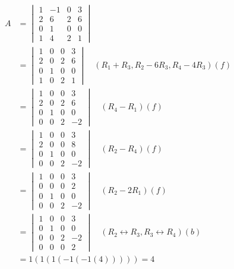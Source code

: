 \documentclass{math}
\begin{document}
\begin{align*}
  A &= \begin{vmatrix}
    1 & -1 & 0 & 3 \\
    2 & 6 & 2 & 6 \\
    0 & 1 & 0 & 0 \\
    1 & 4 & 2 & 1
  \end{vmatrix} \\
  &= \begin{vmatrix}
    1 & 0 & 0 & 3 \\
    2 & 0 & 2 & 6 \\
    0 & 1 & 0 & 0 \\
    1 & 0 & 2 & 1
  \end{vmatrix} \quad (R_1+R_3,R_2-6R_3,R_4-4R_3)(f) \\
  &= \begin{vmatrix}
    1 & 0 & 0 & 3 \\
    2 & 0 & 2 & 6 \\
    0 & 1 & 0 & 0 \\
    0 & 0 & 2 & -2
  \end{vmatrix} \quad (R_4-R_1)(f) \\
  &= \begin{vmatrix}
    1 & 0 & 0 & 3 \\
    2 & 0 & 0 & 8 \\
    0 & 1 & 0 & 0 \\
    0 & 0 & 2 & -2
  \end{vmatrix} \quad (R_2-R_4)(f) \\
  &= \begin{vmatrix}
    1 & 0 & 0 & 3 \\
    0 & 0 & 0 & 2 \\
    0 & 1 & 0 & 0 \\
    0 & 0 & 2 & -2
  \end{vmatrix} \quad (R_2-2R_1)(f) \\
  &= \begin{vmatrix}
    1 & 0 & 0 & 3 \\
    0 & 1 & 0 & 0 \\
    0 & 0 & 2 & -2 \\
    0 & 0 & 0 & 2
  \end{vmatrix} \quad (R_2\leftrightarrow R_3,R_3\leftrightarrow R_4)(b) \\
  &= 1(1(1(-1(-1(4))))) = 4
\end{align*}
\end{document}
